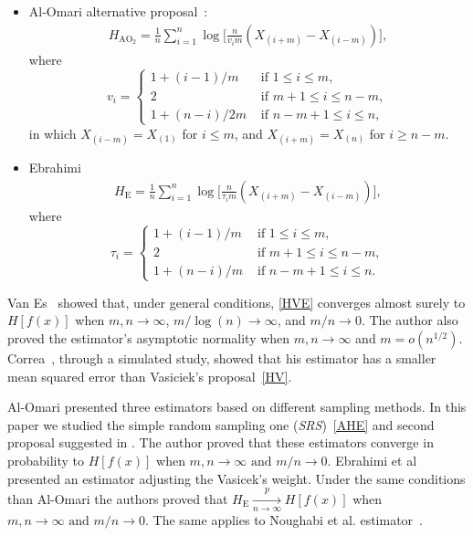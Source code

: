 \documentclass[journal]{IEEEtran}
\begin{document}
\begin{itemize}
	\item Al-Omari alternative proposal~\cite{AlOmari2016}:
	\label{AO2}
	\begin{align}
		H_{{\text{AO}}_2}=\frac{1}{n} \sum_{i=1}^{n} \log \Big[\frac{n}{v_{i} m}\left(X_{(i+m)}-X_{(i-m)}\right)\Big],
	\end{align}
	where
	\begin{equation*}
		v_{i}=\begin{cases}
			1+(i-1)/m & \text{ if }1 \leq i \leq m, \\
			2 & \text{ if } m+1 \leq i \leq n-m, \\
			1+(n-i)/2m & \text{ if } n-m+1 \leq i \leq n,
		\end{cases}
	\end{equation*}
	in which $X_{(i-m)}=X_{(1)}$ for $i \leq m$, and $X_{(i+m)}=X_{(n)}$ for $i \geq n-m$.
	\item Ebrahimi~\cite{Ebrahimi94}
	\begin{align}
		H_\text{E}=\frac{1}{n} \sum_{i=1}^{n} \log \Big[\frac{n}{\tau_{i} m}\left(X_{(i+m)}-X_{(i-m)}\right)\Big],
		\label{HE}
	\end{align}
	where
	\begin{equation*}
		\tau_{i}=\begin{cases}
			1+(i-1)/m & \text{ if }1 \leq i \leq m, \\
			2 & \text{ if } m+1 \leq i \leq n-m, \\
			1+(n-i)/m & \text{ if } n-m+1 \leq i \leq n.
		\end{cases}
	\end{equation*}
\end{itemize}

Van Es~\cite{VanEs92} showed that, under general conditions, \eqref{HVE} converges almost surely to $H[f(x)]$ when $m, n \to \infty$, $m/\log(n) \to \infty$, and $m/n \to 0$.
The author also proved the estimator's asymptotic normality when $m, n \to \infty$ and $m = o(n^{1/2})$. 
Correa~\cite{Correa95}, through a simulated study, showed that his estimator has a smaller mean squared error than Vasiciek's  proposal~\eqref{HV}. 

Al-Omari\cite{AlOmari2014} presented three estimators based on different sampling methods.
In this paper we studied the simple random sampling one (\textit{SRS})~\eqref{AHE} and second proposal suggested
in \cite{AlOmari2016}. 
The author proved that these estimators converge in probability to $ H[f(x)]$ when $m, n \to \infty  \text{ and } m/n \to 0$. 
Ebrahimi et al~\cite{Ebrahimi94} presented an estimator adjusting the Vasicek's\cite{Vasicek76} weight. 
Under the same conditions than Al-Omari\cite{AlOmari2014} the authors proved that $H_{\text{E}}\underset{n \to \infty}{\overset{p}{\longrightarrow}} H[f(x)]$ when $m, n \to \infty  \text{ and } m/n \to 0$. 
The same applies to Noughabi et al. estimator~\cite{Noughabi2010}.
\end{document}
